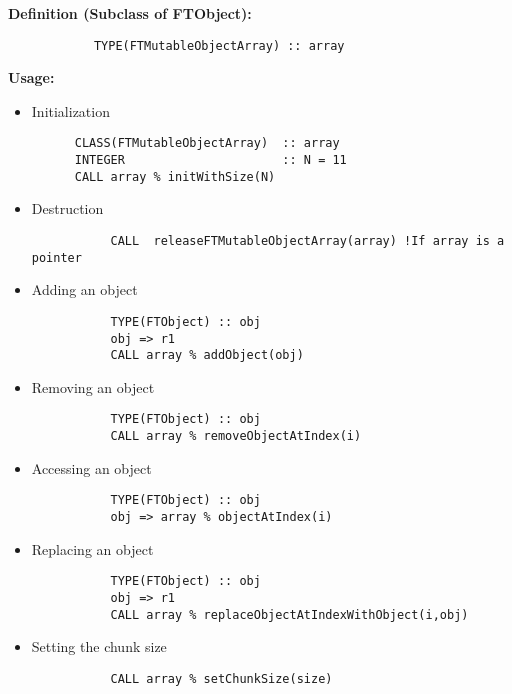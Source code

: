 \documentclass[9pt]{article}
\begin{document}
     {\bf Definition (Subclass of FTObject):}
	{\color{blue}\begin{verbatim}
        	TYPE(FTMutableObjectArray) :: array
	\end{verbatim}}
     {\bf Usage:}

\begin{itemize}
        \item Initialization
		{\color{blue}\begin{verbatim}
      CLASS(FTMutableObjectArray)  :: array
      INTEGER                      :: N = 11
      CALL array % initWithSize(N)
	\end{verbatim}}
	
        \item Destruction
		{\color{blue}\begin{verbatim}
           CALL  releaseFTMutableObjectArray(array) !If array is a pointer
	\end{verbatim}}
	
        \item Adding an object

	{\color{blue}\begin{verbatim}
           TYPE(FTObject) :: obj
           obj => r1
           CALL array % addObject(obj)
	\end{verbatim}}
	
        \item Removing an object
	{\color{blue}\begin{verbatim}
           TYPE(FTObject) :: obj
           CALL array % removeObjectAtIndex(i)
	\end{verbatim}}
		
        \item Accessing an object
	{\color{blue}\begin{verbatim}
           TYPE(FTObject) :: obj
           obj => array % objectAtIndex(i)
	\end{verbatim}}

        \item Replacing an object
	{\color{blue}\begin{verbatim}
           TYPE(FTObject) :: obj
           obj => r1
           CALL array % replaceObjectAtIndexWithObject(i,obj)
	\end{verbatim}}
	
        \item Setting the chunk size
	{\color{blue}\begin{verbatim}
           CALL array % setChunkSize(size)
	\end{verbatim}}
	

\end{itemize}
\end{document}
